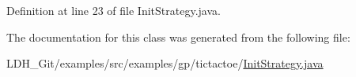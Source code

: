 Definition at line 23 of file Init\-Strategy.\-java.



The documentation for this class was generated from the following file\-:\begin{DoxyCompactItemize}
\item 
L\-D\-H\-\_\-\-Git/examples/src/examples/gp/tictactoe/\hyperlink{tictactoe_2_init_strategy_8java}{Init\-Strategy.\-java}\end{DoxyCompactItemize}
